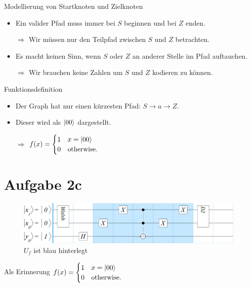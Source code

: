 \documentclass[fleqn,compress,utf8,aspectratio=169,t]{beamer}
\begin{document}
\begin{frame}{Modellierung von Startknoten und Zielknoten}
\begin{itemize}
	\item Ein valider Pfad muss immer bei $S$ beginnen und bei $Z$ enden.
	\item[$\Rightarrow$] Wir müssen nur den Teilpfad zwischen $S$ und $Z$ betrachten.
	\item Es macht keinen Sinn, wenn $S$ oder $Z$ an anderer Stelle im Pfad auftauchen.
	\item[$\Rightarrow$] Wir brauchen keine Zahlen um $S$ und $Z$ kodieren zu können.
\end{itemize}
\end{frame}

\begin{frame}{Funktionsdefinition}
\begin{itemize}
	\item Der Graph hat nur einen kürzesten Pfad: $S \rightarrow a \rightarrow Z$.
	\item Dieser wird als $\ket{00}$ dargestellt.
	\item[$\Rightarrow$] $f(x) = \begin{cases}
	1 & x = \ket{00}\\
	0 & \text{otherwise.}\\
	\end{cases}$
\end{itemize}
\end{frame}

\section{Aufgabe 2c}

\begin{frame}{}
\begin{figure}
\centering
\includegraphics[width=\textwidth]{images/2c.png}
\caption{$U_f$ ist blau hinterlegt}
\end{figure}
Als Erinnerung $f(x) = \begin{cases}
1 & x = \ket{00}\\
0 & \text{otherwise.}\\
\end{cases}$
\end{frame}
\end{document}
